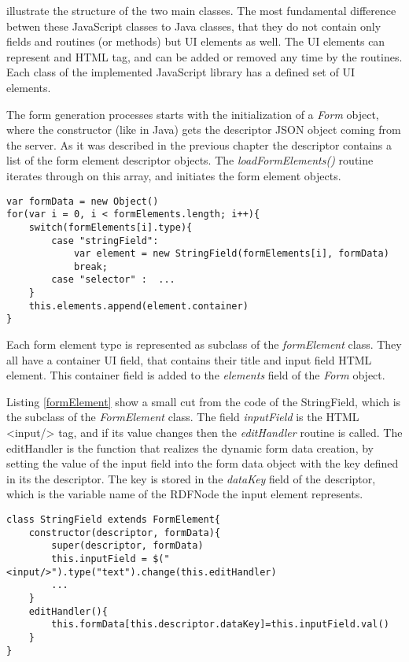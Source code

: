 
 illustrate the structure of the two main classes. The most fundamental difference betwen these JavaScript classes to Java classes, that they do not contain only fields and routines (or methods) but UI elements as well. The UI elements can represent and HTML tag, and can be added or removed any time by the routines. Each class of the implemented JavaScript library has a defined set of UI elements. 

The form generation processes starts with the initialization of a \textit{Form} object, where the constructor (like in Java) gets the descriptor JSON object coming from the server. As it was described in the previous chapter the descriptor contains a list of the form element descriptor objects. The \textit{loadFormElements()} routine iterates through on this array, and initiates the form element objects.

\begin{lstlisting}[basicstyle=\footnotesize, frame=single, caption={Form generation based on configuration data}, label=formGen captionpos=b, belowskip=1em, aboveskip=2em]
var formData = new Object()
for(var i = 0, i < formElements.length; i++){
	switch(formElements[i].type){
		case "stringField":
			var element = new StringField(formElements[i], formData)
			break;
		case "selector" :  ...
	}
	this.elements.append(element.container)
}	
\end{lstlisting}


Each form element type is represented as subclass of the \textit{formElement} class. They all have a container UI field, that contains their title and input field HTML element. This container field is added to the \textit{elements} field of the \textit{Form} object.

Listing \ref{formElement} show a small cut from the code of the StringField, which is the subclass of the \textit{FormElement} class. The field \textit{inputField} is the HTML <input/> tag, and if its value changes then the \textit{editHandler} routine is called. The editHandler is the function that realizes the dynamic form data creation, by setting the value of the input field into the form data object with the key defined in its the descriptor. The key is stored in the \textit{dataKey} field of the descriptor, which is the variable name of the RDFNode the input element represents.


\begin{lstlisting}[basicstyle=\footnotesize, frame=single, caption={Form element}, label=formElement, captionpos=b, belowskip=1em, aboveskip=2em]
class StringField extends FormElement{
	constructor(descriptor, formData){
		super(descriptor, formData)
		this.inputField = $("<input/>").type("text").change(this.editHandler)
		...
	}
	editHandler(){
		this.formData[this.descriptor.dataKey]=this.inputField.val() 
	}			
}
\end{lstlisting}

